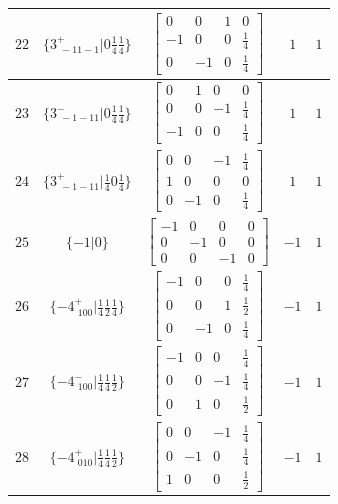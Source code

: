 \documentclass[fleqn,8pt]{jsarticle}
\begin{document}
\begin{longtable}{ccccc}
$ 22 $ & $ \{3^{+}_{\,\,-11-1}|0 \frac{1}{4} \frac{1}{4}\} $ & $ \begin{bmatrix} 0 & 0 & 1 & 0 \\ -1 & 0 & 0 & \frac{1}{4} \\ 0 & -1 & 0 & \frac{1}{4} \end{bmatrix} $ & $ 1 $ & $ 1 $ \\ \hline
$ 23 $ & $ \{3^{-}_{\,\,-1-11}|0 \frac{1}{4} \frac{1}{4}\} $ & $ \begin{bmatrix} 0 & 1 & 0 & 0 \\ 0 & 0 & -1 & \frac{1}{4} \\ -1 & 0 & 0 & \frac{1}{4} \end{bmatrix} $ & $ 1 $ & $ 1 $ \\ \hline
$ 24 $ & $ \{3^{+}_{\,\,-1-11}|\frac{1}{4} 0 \frac{1}{4}\} $ & $ \begin{bmatrix} 0 & 0 & -1 & \frac{1}{4} \\ 1 & 0 & 0 & 0 \\ 0 & -1 & 0 & \frac{1}{4} \end{bmatrix} $ & $ 1 $ & $ 1 $ \\ \hline
$ 25 $ & $ \{-1|0\} $ & $ \begin{bmatrix} -1 & 0 & 0 & 0 \\ 0 & -1 & 0 & 0 \\ 0 & 0 & -1 & 0 \end{bmatrix} $ & $ -1 $ & $ 1 $ \\ \hline
$ 26 $ & $ \{-4^{+}_{\,\,100}|\frac{1}{4} \frac{1}{2} \frac{1}{4}\} $ & $ \begin{bmatrix} -1 & 0 & 0 & \frac{1}{4} \\ 0 & 0 & 1 & \frac{1}{2} \\ 0 & -1 & 0 & \frac{1}{4} \end{bmatrix} $ & $ -1 $ & $ 1 $ \\ \hline
$ 27 $ & $ \{-4^{-}_{\,\,100}|\frac{1}{4} \frac{1}{4} \frac{1}{2}\} $ & $ \begin{bmatrix} -1 & 0 & 0 & \frac{1}{4} \\ 0 & 0 & -1 & \frac{1}{4} \\ 0 & 1 & 0 & \frac{1}{2} \end{bmatrix} $ & $ -1 $ & $ 1 $ \\ \hline
$ 28 $ & $ \{-4^{+}_{\,\,010}|\frac{1}{4} \frac{1}{4} \frac{1}{2}\} $ & $ \begin{bmatrix} 0 & 0 & -1 & \frac{1}{4} \\ 0 & -1 & 0 & \frac{1}{4} \\ 1 & 0 & 0 & \frac{1}{2} \end{bmatrix} $ & $ -1 $ & $ 1 $ \\ \hline

\end{longtable}
\end{document}
